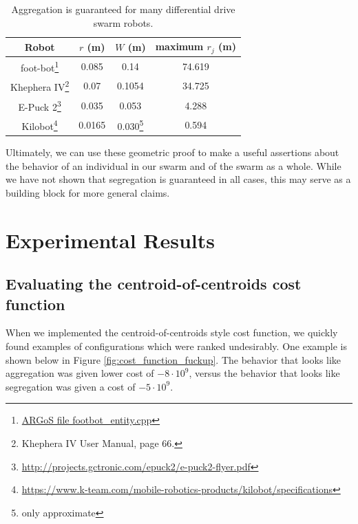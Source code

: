 \documentclass[conference]{IEEEtran}
\begin{document}
    \begin{savenotes}
    \begin{table}
      \centering
      \caption{Aggregation is guaranteed for many differential drive swarm robots.}
      \begin{tabular}{|c|c|c|c|} \hline
        Robot & $r$ (m) & $W$ (m) & maximum $r_j$ (m) \\ \hline
        foot-bot\footnote{\href{https://github.com/ilpincy/argos3/blob/master/src/plugins/robots/foot-bot/simulator/footbot_entity.cpp}{ARGoS file footbot\_entity.cpp}} &
            0.085 & 0.14 & 74.619 \\ \hline
        Khephera IV\footnote{Khephera IV User Manual, page 66.} &
            0.07 & 0.1054 & 34.725 \\ \hline
        E-Puck 2\footnote{\href{http://projects.gctronic.com/epuck2/e-puck2-flyer.pdf}{http://projects.gctronic.com/epuck2/e-puck2-flyer.pdf}} &
            0.035 & 0.053 & 4.288 \\ \hline
        Kilobot\footnote{\href{https://www.k-team.com/mobile-robotics-products/kilobot/specifications}{https://www.k-team.com/mobile-robotics-products/kilobot/specifications}} &
            0.0165 & 0.030\footnote{only approximate} & 0.594 \\ \hline
      \end{tabular}
      \label{table:robots}
    \end{table}
    \end{savenotes}

    Ultimately, we can use these geometric proof to make a useful assertions about the behavior of an individual in our swarm and of the swarm as a whole. While we have not shown that segregation is guaranteed in all cases, this may serve as a building block for more general claims.

\section{Experimental Results}

  \subsection{Evaluating the centroid-of-centroids cost function} \label{section:evaluting_cost_functions}

    When we implemented the centroid-of-centroids style cost function, we quickly found examples of configurations which were ranked undesirably. One example is shown below in Figure \ref{fig:cost_function_fuckup}. The behavior that looks like aggregation was given lower cost of $-8\cdot 10^{9}$, versus the behavior that looks like segregation was given a cost of $-5\cdot 10^{9}$.
\end{document}
